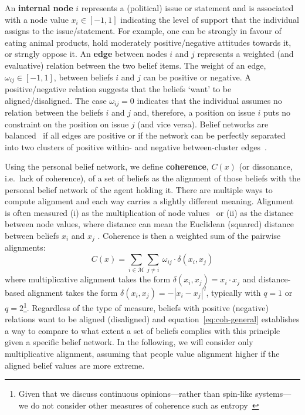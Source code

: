\documentclass[10pt]{article}
\begin{document}
An \textbf{internal node} $i$ represents a (political) issue or statement and is associated with a node value $x_i \in [-1,1]$ indicating the level of support that the individual assigns to the issue/statement. For example, one can be strongly in favour of eating animal products, hold moderately positive/negative attitudes towards it, or strngly oppose it. An \textbf{edge} between nodes $i$ and $j$ represents a weighted (and evaluative) relation between the two belief items. The weight of an edge, $\omega_{ij}\in[-1,1]$, between beliefs $i$ and $j$ can be positive or negative. A positive/negative relation suggests that the beliefs `want' to be aligned/disaligned. The case $\omega_{ij}=0$ indicates that the individual assumes no relation between the beliefs $i$ and $j$ and, therefore, a position on issue $i$ puts no constraint on the position on issue $j$ (and vice versa). Belief networks are balanced~\cite{heiderAttitudesCognitiveOrganization1946} if all edges are positive or if the network can be perfectly separated into two clusters of positive within- and negative between-cluster edges~\cite{dalegeLearningIsingModel}. 

Using the personal belief network, we define \textbf{coherence}, $C(x)$ (or dissonance, i.e.\ lack of coherence), of a set of beliefs as the alignment of those beliefs with the personal belief network of the agent holding it. There are multiple ways to compute alignment and each way carries a slightly different meaning. Alignment is often measured (i) as the multiplication of node values~\cite{dalegeNetworksBeliefsIntegrative2024} or (ii) as the distance between node values, where distance can mean the Euclidean (squared) distance between beliefs $x_i$ and $x_j$ \cite[see e.g.\ opinion dynamics literature][]{degrootReachingConsensus1974,friedkinSocialInfluenceOpinions1990,deffuantMixingBeliefsInteracting2000}. Coherence is then a weighted sum of the pairwise alignments: 
\begin{equation}\label{eq:coh-general}
    C(x) = \sum_{i \in \mathcal{M}} \sum_{j\neq i} \ \omega_{ij} \cdot \delta(x_i, x_j) %
    \end{equation}
where multiplicative alignment takes the form $\delta(x_i, x_j)= x_i \cdot x_j$ and distance-based alignment takes the form $\delta(x_i, x_j) = - |x_i - x_j|^q$, typically with $q=1$ or $q=2$\footnote{Given that we discuss continuous opinions---rather than spin-like systems---we do not consider other measures of coherence such as entropy~\cite{dalegeAttitudinalEntropyAE2018}}. Regardless of the type of measure, beliefs with positive (negative) relations want to be aligned (disaligned) and equation~\ref{eq:coh-general} establishes a way to compare to what extent a set of beliefs complies with this principle given a specific belief network. In the following, we will consider only multiplicative alignment, assuming that people value alignment higher if the aligned belief values are more extreme.
\end{document}
